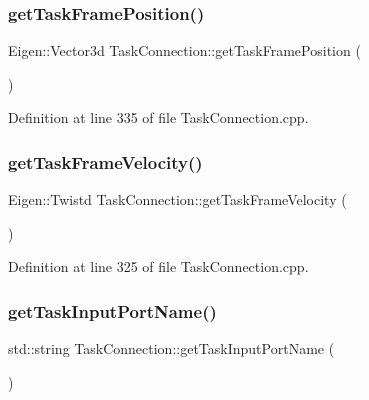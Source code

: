 \subsubsection{\texorpdfstring{get\+Task\+Frame\+Position()}{getTaskFramePosition()}}
{\footnotesize\ttfamily Eigen\+::\+Vector3d Task\+Connection\+::get\+Task\+Frame\+Position (\begin{DoxyParamCaption}{ }\end{DoxyParamCaption})}



Definition at line 335 of file Task\+Connection.\+cpp.

\hypertarget{classocra__recipes_1_1TaskConnection_a3ae346f85c5b8655698630b3f3474886}{}\label{classocra__recipes_1_1TaskConnection_a3ae346f85c5b8655698630b3f3474886} 
\subsubsection{\texorpdfstring{get\+Task\+Frame\+Velocity()}{getTaskFrameVelocity()}}
{\footnotesize\ttfamily Eigen\+::\+Twistd Task\+Connection\+::get\+Task\+Frame\+Velocity (\begin{DoxyParamCaption}{ }\end{DoxyParamCaption})}



Definition at line 325 of file Task\+Connection.\+cpp.

\hypertarget{classocra__recipes_1_1TaskConnection_ac6368ebb5b32d5319cec98fcf09d38fd}{}\label{classocra__recipes_1_1TaskConnection_ac6368ebb5b32d5319cec98fcf09d38fd} 
\subsubsection{\texorpdfstring{get\+Task\+Input\+Port\+Name()}{getTaskInputPortName()}}
{\footnotesize\ttfamily std\+::string Task\+Connection\+::get\+Task\+Input\+Port\+Name (\begin{DoxyParamCaption}{ }\end{DoxyParamCaption})}



